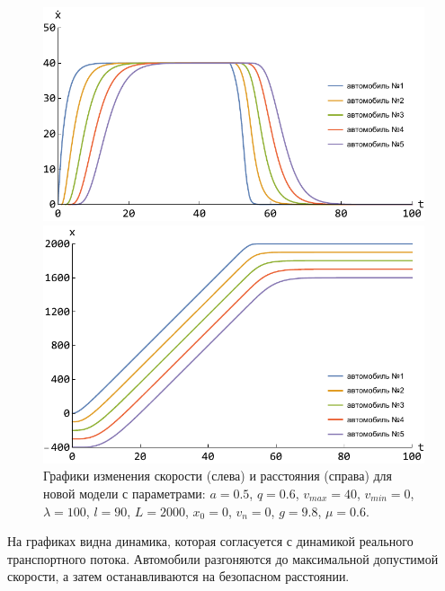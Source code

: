 \documentclass[12pt, a4paper]{extarticle}
\numberwithin{equation}{section}
\numberwithin{figure}{section}
\begin{document}
\begin{figure}[h!]
	\begin{center}
		\begin{minipage}[h!]{0.48\linewidth}
			\includegraphics[width=1\linewidth,height=0.2\textheight]
			{Images/new_model_speed.pdf}
		\end{minipage}
		\hfill 
		\begin{minipage}[h!]{0.48\linewidth}
			\includegraphics[width=1\linewidth,height=0.2\textheight]
			{Images/new_model_distanse.pdf}
		\end{minipage}
		\caption{Графики изменения скорости (слева) и расстояния (справа) для новой модели с параметрами: $a=0.5$, $q=0.6$, $v_{max}=40$, $v_{min}=0$, $\lambda=100$, $l=90$, $L=2000$, $x_0=0$, $v_n=0$, $g=9.8$, $\mu=0.6$. }
		\label{new_model_picture}
	\end{center}
\end{figure}

На графиках видна динамика, которая согласуется с динамикой реального транспортного потока. Автомобили разгоняются до максимальной допустимой скорости, а затем останавливаются на безопасном расстоянии. 
\end{document}
